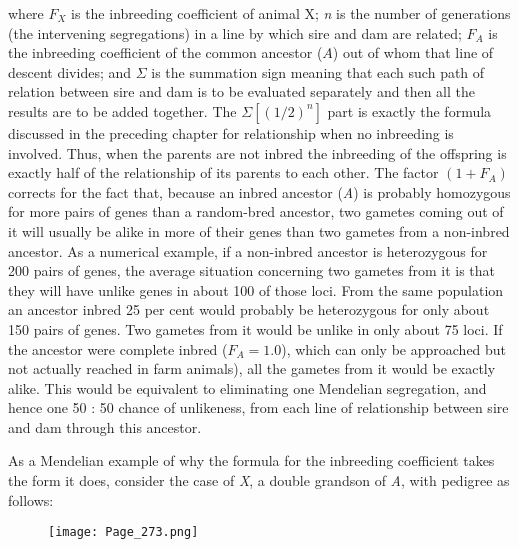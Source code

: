 \noindent
where $F_X$ is the inbreeding coefficient of animal X; \textit{n} is the number of
generations (the intervening segregations) in a line by which sire and
dam are related; $F_A$ is the inbreeding coefficient of the common ancestor
($A$) out of whom that line of descent divides; and $\Sigma$ is the summation
sign meaning that each such path of relation between sire and dam is to
be evaluated separately and then all the results are to be added together.
The $\Sigma [(1/2)^n]$ part is exactly the formula discussed in the preceding
chapter for relationship when no inbreeding is involved. Thus, when
the parents are not inbred the inbreeding of the offspring is exactly
half of the relationship of its parents to each other. The factor $(1 + F_A)$
corrects for the fact that, because an inbred ancestor (\textit{A}) is probably
homozygous for more pairs of genes than a random-bred ancestor, two
gametes coming out of it will usually be alike in more of their genes
than two gametes from a non-inbred ancestor. As a numerical example, if a
non-inbred ancestor is heterozygous for 200 pairs of genes, the average
situation concerning two gametes from it is that they will have
unlike genes in about 100 of those loci. From the same population an
ancestor inbred 25 per cent would probably be heterozygous for only
about 150 pairs of genes. Two gametes from it would be unlike in only
about 75 loci. If the ancestor were complete inbred (\(F_A = 1.0\)), which
can only be approached but not actually reached in farm animals), all
the gametes from it would be exactly alike. This would be equivalent
to eliminating one Mendelian segregation, and hence one 50 : 50 chance
of unlikeness, from each line of relationship between sire and dam
through this ancestor.

As a Mendelian example of why the formula for the inbreeding
coefficient takes the form it does, consider the case of \textit{X}, a
double grandson of \textit{A}, with pedigree as follows:

\begin{figure}[h]
	\centering
    \texttt{[image: Page\_273.png]}
    \label{fig:Lush_Figure_Page-273}
\end{figure}

